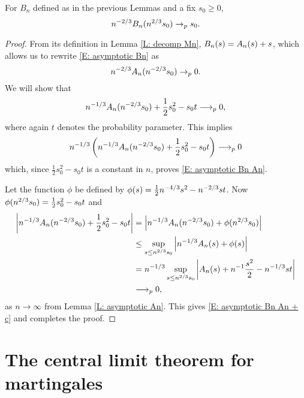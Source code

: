 \begin{lemma} \label{L: asymptotic Bn}
	For $B_n$ defined as in the previous Lemmas and a fix $s_0 \geq 0$,
	\begin{equation} \label{E: asymptotic Bn}
	n^{-2 / 3} B_n(n^{2 / 3}s_0) \rightarrow_p s_0.
	\end{equation}
\end{lemma}
\begin{proof} \label{P: asymptotic Bn}
	From its definition in Lemma \ref{L: decomp Mn}, $B_n(s) = A_n(s) + s$, which allows us to rewrite \ref{E: asymptotic Bn} as
	\begin{equation} \label{E: asymptotic Bn An}
	n^{-2 / 3} A_n(n^{-2 / 3}s_0) \rightarrow_p 0.
	\end{equation}
	We will show that
	\begin{equation} \label{E: asymptotic Bn An + c}
	n^{-1 / 3} A_n(n^{-2 / 3}s_0) + \frac{1}{2}s_0^2 - s_0t \longrightarrow_p 0,
	\end{equation}
	where again $t$ denotes the probability parameter. 
	This implies
	\begin{equation*}
	n^{-1 / 3} \left( n^{-1 / 3} A_n(n^{-2 / 3}s_0) + \frac{1}{2}s_0^2 - s_0t \right) \longrightarrow_p 0
	\end{equation*}
	which, since $\frac{1}{2}s_0^2 - s_0t$ is a constant in $n$, proves \ref{E: asymptotic Bn An}.
	
	Let the function $\phi$ be defined by $\phi(s) = \frac{1}{2}n^{-4 / 3}s^2 - n^{-2 / 3}st$.	
	Now $\phi(n^{2 / 3}s_0) = \frac{1}{2}s_0^2 - s_0t$ and
	\begin{align*}
	\left| n^{-1 / 3} A_n(n^{-2 / 3}s_0) + \frac{1}{2}s_0^2 - s_0t \right| 
	&= \left| n^{-1 / 3} A_n(n^{-2 / 3}s_0) + \phi(n^{2 / 3}s_0) \right| \\
	&\leq \sup_{s \leq n^{2 / 3} s_0 } \left| n^{-1 / 3} A_n(s) + \phi(s) \right| \\
	&= n^{-1 / 3} \sup_{s \leq n^{2 / 3} s_0 } \left| A_n(s) + n^{-1}\frac{s^2}{2} - n^{-1 / 3}st \right| \\
	&\longrightarrow_p 0,
	\end{align*}
	as $n \rightarrow \infty$ from Lemma \ref{L: asymptotic An}. This gives \ref{E: asymptotic Bn An + c} and completes the proof.
\end{proof}


\section{The central limit theorem for martingales}

